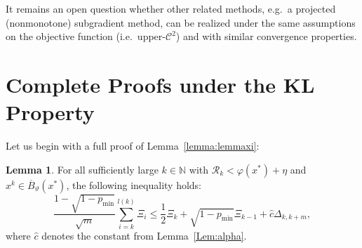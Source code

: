 \documentclass[a4paper, 12pt]{article}
\numberwithin{equation}{section}
\theoremstyle{bolddef}
\theoremstyle{definition}
\theoremstyle{boldplain}
\newtheorem{lemma}[definition]{Lemma}
\newcommand{\xk}{x^k}
\newcommand{\Rvalue}{\mathcal{R}}
\newcommand{\clball}{\overline{B}}
\begin{document}
It remains an open question whether other related methods, e.g.\ a projected (nonmonotone) subgradient method, can be realized under the same assumptions on the objective function (i.e.\ upper-$\mathcal{C}^2$) and with similar convergence properties.

\printbibliography

\appendix

\section{Complete Proofs under the KL Property}

Let us begin with a full proof of Lemma~\ref{lemma:lemmaxi}:

\begin{lemma}\label{lemma:lemmaxiproof}
For all sufficiently large $k \in \mathbb{N}$ with $\Rvalue_k < \varphi(x^*) + \eta$ and $\xk \in \clball_\vartheta(x^*)$, the following inequality holds:
\begin{equation}\label{eq:lemmaxi}
	\frac{1-\sqrt{1-p_{\min}}}{\sqrt{m}} \sum_{i = k}^{l(k)} \Xi_i \leq \frac{1}{2} \Xi_k + \sqrt{1-p_{\min}} \Xi_{k-1} + \hat c \Delta_{k, k+m},
\end{equation}
where $\hat c $ denotes the constant from Lemma~\ref{Lem:alpha}.
\end{lemma}
\end{document}
